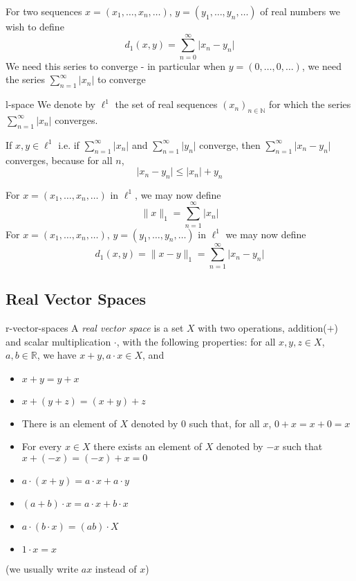 \documentclass{article}
\begin{document}
For two sequences $x = (x_{1}, \dots ,x_{n},\dots),\, y=(y_{1},\dots,y_{n},\dots)$ of real numbers we wish to define
\[d_{1}(x,y) = \sum_{n = 0}^{\infty} \lvert x_{n} - y_{n} \rvert\]
We need this series to converge - in particular when $y=(0,\dots,0,\dots)$, we need the series $\displaystyle\sum_{n = 1}^{\infty}\lvert x_{n} \rvert$ to converge

\begin{dfn}[l space]{l-space}{}
    We denote by $\ell^{1}$ the set of real sequences $(x_{n})_{n\in\mathbb{N}}$ for which the series $\displaystyle\sum_{n = 1}^{\infty}\lvert x_{n} \rvert$ converges.
\end{dfn}

If $x,y\in \ell^{1}$ i.e. if $\displaystyle\sum_{n = 1}^{\infty}\lvert x_{n} \rvert$ and $\displaystyle\sum_{n = 1}^{\infty}\lvert y_{n} \rvert$ converge, then $\displaystyle\sum_{n = 1}^{\infty} \lvert x_{n} - y_{n} \rvert$ converges, because for all $n$,
\[\lvert x_{n} - y_{n} \rvert \le \lvert x_{n} \rvert + y_{n}\]

For $x = (x_{1}, \dots, x_{n}, \dots)$ in $\ell^{1}$, we may now define
\[\lVert x \rVert_{1} = \sum_{n = 1}^{\infty}\lvert x_{n} \rvert\]
For $x = (x_{1}, \dots , x_{n}, \dots),\, y = (y_{1}, \dots, y_{n}, \dots)$ in $\ell^{1}$ we may now define
\[d_{1}(x,y) = \lVert x - y \rVert_{1} = \sum_{n = 1}^{\infty} \lvert x_{n} - y_{n} \rvert\]
\newpage
\subsection{Real Vector Spaces}
\begin{dfn}{r-vector-spaces}{}
    A \textit{real vector space} is a set $X$ with two operations, addition($+$) and scalar multiplication $\cdot$, with the following properties: for all $x,y,z\in X$, $a,b\in\mathbb{R}$, we have $x + y, a\cdot x\in X$, and
    \begin{itemize}
        \item $x + y = y + x$
        \item $x + (y + z) = (x + y) + z$
        \item There is an element of $X$ denoted by $0$ such that, for all $x$, $0 + x = x + 0 = x$
        \item For every $x\in X$ there exists an element of $X$ denoted by $-x$ such that $x + (-x) = (-x) + x = 0$
        \item $a \cdot (x + y) = a \cdot x + a \cdot y$
        \item $(a + b) \cdot x = a \cdot x + b \cdot x$
        \item $a \cdot (b \cdot x) = (ab) \cdot X$
        \item $1 \cdot x = x$
    \end{itemize}
    (we usually write $ax$ instead of $x$)
\end{dfn}
\end{document}
